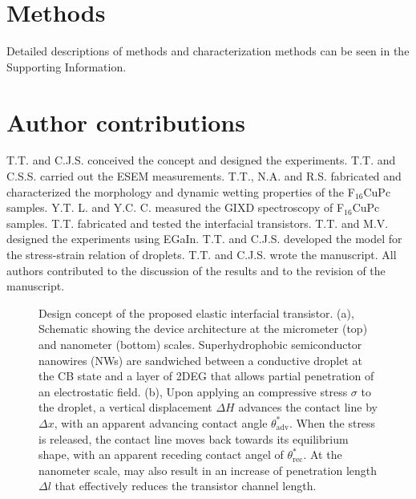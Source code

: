 \section{Methods}
\label{sec:small-method}
Detailed descriptions of methods and characterization methods can be seen in the Supporting Information.


\section{Author contributions}
\label{sec:small-contrib}
T.T. and C.J.S. conceived the concept and designed the
experiments. T.T. and C.S.S. carried out the ESEM
measurements. T.T., N.A. and R.S. fabricated and characterized the
morphology and dynamic wetting properties of the F\(_{\text{16}}\)CuPc
samples. Y.T. L. and Y.C. C. measured the GIXD spectroscopy of
F\(_{\text{16}}\)CuPc samples. T.T. fabricated and tested the interfacial
transistors. T.T. and M.V. designed the experiments using
EGaIn. T.T. and C.J.S. developed the model for the stress-strain
relation of droplets. T.T. and C.J.S. wrote the manuscript. All
authors contributed to the discussion of the results and to the
revision of the manuscript.



% 

\newpage{}

\begin{figure}[htbp]
\centering
\caption{\label{fig:small-main-1}
Design concept of the proposed elastic interfacial transistor. (a), Schematic showing the device architecture at the micrometer (top) and nanometer (bottom) scales. Superhydrophobic semiconductor nanowires (NWs) are sandwiched between a conductive droplet at the CB state and a layer of 2DEG that allows partial penetration of an electrostatic field. (b), Upon applying an compressive stress \(\sigma\) to the droplet, a vertical displacement \(\Delta H\) advances the contact line by \(\Delta x\), with an apparent advancing contact angle \(\theta_{\mathrm{adv}}^{*}\). When the stress is released, the contact line moves back towards its equilibrium shape, with an apparent receding contact angel of \(\theta_{\mathrm{rec}}^{*}\). At the nanometer scale,  may also result in an increase of penetration length \(\Delta l\) that effectively reduces the transistor channel length.}
\end{figure}


